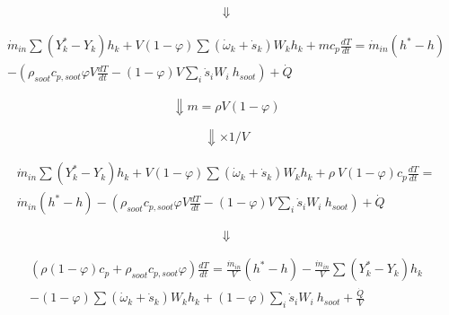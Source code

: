 \begin{equation*}
	\Downarrow
\end{equation*}


\begin{equation*}
	\begin{split}
		{\dot{m}}_{in}\sum\left(Y_k^\ast-Y_k\right)h_k
		+
		V\left(1-\varphi\right)\sum{\left({\dot{\omega}}_k
			+
			{\dot{s}}_k\right)W_kh_k}
		+
		mc_p\frac{dT}{dt}
		=
		{\dot{m}}_{in}\left(h^\ast-h\right)
		\\
		-\left(\rho_{soot}c_{p,soot}\varphi V\frac{dT}{dt}-\left(1-\varphi\right)V\sum_{i}{{\dot{s}}_iW_i}\ h_{soot}\right)+\dot{Q}
	\end{split}
\end{equation*}


\begin{equation*}
	\Downarrow m=\rho V (1-\varphi) 
\end{equation*}

\begin{equation*}
	\Downarrow \times 1/V
\end{equation*}

\begin{equation*}
	\begin{split}
	{\dot{m}}_{in}\sum\left(Y_k^\ast-Y_k\right)h_k+V\left(1-\varphi\right)\sum{\left({\dot{\omega}}_k+{\dot{s}}_k\right)W_kh_k}+\rho\ V\left(1-\varphi\right)c_p\frac{dT}{dt}=
	\\
	{\dot{m}}_{in}\left(h^\ast-h\right)-\left(\rho_{soot}c_{p,soot}\varphi V\frac{dT}{dt}-\left(1-\varphi\right)V\sum_{i}{{\dot{s}}_iW_i}\ h_{soot}\right)+\dot{Q}
	\end{split}
\end{equation*}


\begin{equation*}
	\Downarrow
\end{equation*}


\begin{equation*}
	\begin{split}
	\left(\rho\left(1-\varphi\right)c_p+\rho_{soot}c_{p,soot}\varphi\right)\frac{dT}{dt}=
	\frac{{\dot{m}}_{in}}{V}
	\left(h^\ast-h\right)
	-
	\frac{{\dot{m}}_{in}}{V}\sum\left(Y_k^\ast-Y_k\right)h_k\\
	-
	\left(1-\varphi\right)\sum{\left({\dot{\omega}}_k
	+{\dot{s}}_k\right)W_kh_k}+\left(1-\varphi\right)\sum_{i}{{\dot{s}}_iW_i}\ h_{soot}+\frac{\dot{Q}}{V}
	\end{split}
\end{equation*}


